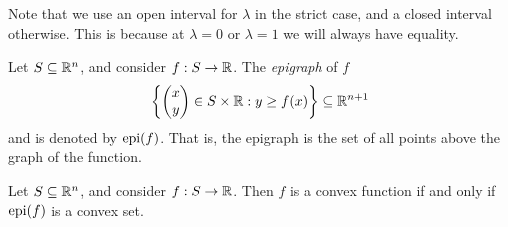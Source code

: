 \begin{rmk}
    Note that we use an open interval for $\lambda$ in the strict case, and a closed interval otherwise. This is because at $\lambda = 0$ or $\lambda = 1$ we will always have equality.
\end{rmk}

\begin{defn}
    Let $S \subseteq \mathbb{R}^n$, and consider $f: S \to \mathbb{R}$. The \emph{epigraph} of $f$ 
    \begin{align*}
        \left\{\begin{pmatrix}
            x \\ y
        \end{pmatrix} \in S \times \mathbb{R} : y \geq f(x)\right\} \subseteq \mathbb{R}^{n+1}
    \end{align*}
    and is denoted by $\operatorname{epi}(f)$. That is, the epigraph is the set of all points above the graph of the function.
\end{defn}

\begin{prop}\label{epigraph-convexity}
    Let $S \subseteq \mathbb{R}^n$, and consider $f: S \to \mathbb{R}$. Then $f$ is a convex function if and only if $\operatorname{epi}(f)$ is a convex set.
\end{prop}

